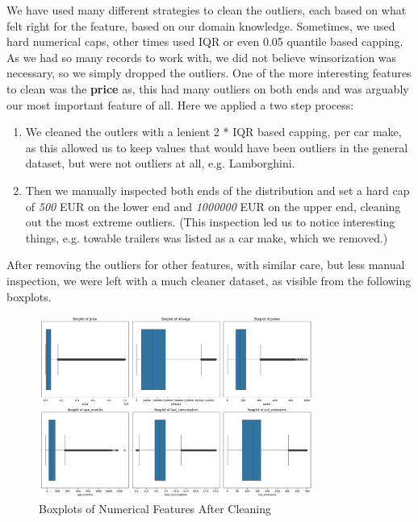\documentclass[12pt]{article}
\begin{document}
We have used many different strategies to clean the outliers, each based on what felt right for the feature, based on our domain knowledge. Sometimes, we used hard numerical caps, other times used IQR or even 0.05 quantile based capping. As we had so many records to work with, we did not believe winsorization was necessary, so we simply dropped the outliers.
One of the more interesting features to clean was the \textbf{price} as, this had many outliers on both ends and was arguably our most important feature of all. Here we applied a two step process:

\begin{enumerate}
  \item We cleaned the outlers with a lenient 2 * IQR based capping, per car make, as this allowed us to keep values that would have been outliers in the general dataset, but were not outliers at all, e.g. Lamborghini.
  \item Then we manually inspected both ends of the distribution and set a hard cap of \textit{500} EUR on the lower end and \textit{1000000} EUR on the upper end, cleaning out the most extreme outliers. (This inspection led us to notice interesting things, e.g. towable trailers was listed as a car make, which we removed.)
\end{enumerate}

After removing the outliers for other features, with similar care, but less manual inspection, we were left with a much cleaner dataset, as visible from the following boxplots.

\begin{figure}[ht]
  \centering
  \includegraphics[width=0.8\textwidth]{./images/boxplots_after.png}
  \caption{Boxplots of Numerical Features After Cleaning}
  \label{fig:boxplots_after}
\end{figure}
\end{document}
